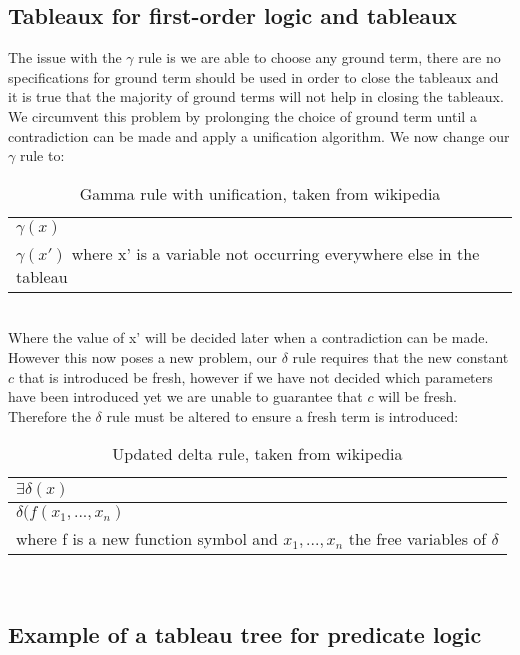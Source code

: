 \documentclass{article}%
\begin{document}
\subsection{Tableaux for first-order logic and tableaux}
The issue with the $\gamma$ rule is we are able to choose any ground term, there are no specifications for ground term should be used in order to close the tableaux and it is true that the majority of ground terms will not help in closing the tableaux. We circumvent this problem by prolonging the choice of ground term until a contradiction can be made and apply a unification algorithm. \cite{fitting_2013} We now change our $\gamma$ rule to:
\begin{table}[h]
\centering
\begin{tabular}{l}
$\gamma(x)$                                                                      \\
$\gamma(x')$ where x' is a variable not occurring everywhere else in the tableau
\end{tabular}
\caption{Gamma rule with unification, taken from wikipedia \cite{wikipediatableau}}
\label{tab:gammawithunification}
\end{table}\\
Where the value of x' will be decided later when a contradiction can be made. 
However this now poses a new problem, our $\delta$ rule requires that the new constant $c$ that is introduced be fresh, however if we have not decided which parameters have been introduced yet we are unable to guarantee that $c$ will be fresh. Therefore the  
$\delta$ rule must be altered to ensure a fresh term is introduced:  
\begin{table}[h]
\centering
\begin{tabular}{|l|}
\hline
$\exists\delta(x)$                                                                                        \\ \hline
$\delta(f(x_1,...,x_n)$ \\ where f is a new function symbol and $x_1,...,x_n$ the free variables of $\delta$ \\ \hline
\end{tabular}
\caption{Updated delta rule, taken from wikipedia \cite{wikipediatableau}}
\label{tab:deltarule}
\end{table}\\

\subsection{Example of a tableau tree for predicate logic}
\end{document}
